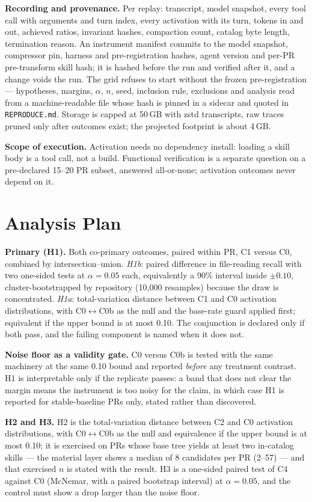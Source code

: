 \documentclass[10pt,conference]{IEEEtran}
\begin{document}
\textbf{Recording and provenance.} Per replay: transcript, model snapshot, every tool call with arguments and turn index, every activation with its turn, tokens in and out, achieved ratios, invariant hashes, compaction count, catalog byte length, termination reason. An instrument manifest commits to the model snapshot, compressor pin, harness and pre-registration hashes, agent version and per-PR pre-transform skill hash; it is hashed before the run and verified after it, and a change voids the run. The grid refuses to start without the frozen pre-registration --- hypotheses, margins, $\alpha$, $n$, seed, inclusion rule, exclusions and analysis read from a machine-readable file whose hash is pinned in a sidecar and quoted in \texttt{REPRODUCE.md}. Storage is capped at 50\,GB with zstd transcripts, raw traces pruned only after outcomes exist; the projected footprint is about 4\,GB.

\textbf{Scope of execution.} Activation needs no dependency install: loading a skill body is a tool call, not a build. Functional verification is a separate question on a pre-declared 15--20 PR subset, answered all-or-none; activation outcomes never depend on it.

\section{Analysis Plan}
\label{sec:analysis}
\textbf{Primary (H1).} Both co-primary outcomes, paired within PR, C1 versus C0, combined by intersection--union. \emph{H1b}: paired difference in file-reading recall with two one-sided tests at $\alpha=0.05$ each, equivalently a 90\% interval inside $\pm0.10$, cluster-bootstrapped by repository (10{,}000 resamples) because the draw is concentrated. \emph{H1a}: total-variation distance between C1 and C0 activation distributions, with C0$\leftrightarrow$C0b as the null and the base-rate guard applied first; equivalent if the upper bound is at most 0.10. The conjunction is declared only if both pass, and the failing component is named when it does not.

\textbf{Noise floor as a validity gate.} C0 versus C0b is tested with the same machinery at the same 0.10 bound and reported \emph{before} any treatment contrast. H1 is interpretable only if the replicate passes: a band that does not clear the margin means the instrument is too noisy for the claim, in which case H1 is reported for stable-baseline PRs only, stated rather than discovered.

\textbf{H2 and H3.} H2 is the total-variation distance between C2 and C0 activation distributions, with C0$\leftrightarrow$C0b as the null and equivalence if the upper bound is at most 0.10; it is exercised on PRs whose base tree yields at least two in-catalog skills --- the material layer shows a median of 8 candidates per PR (2--57) --- and that exercised $n$ is stated with the result. H3 is a one-sided paired test of C4 against C0 (McNemar, with a paired bootstrap interval) at $\alpha=0.05$, and the control must show a drop larger than the noise floor.
\end{document}
